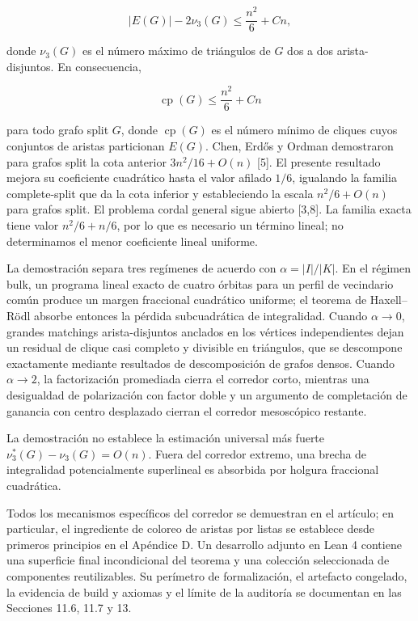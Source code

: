 \documentclass[
  spanish,
  11pt,
  a4paper,
]{article}
\begin{document}
\[
|E(G)|-2\nu_3(G)
\le
\frac{n^2}{6}+Cn,
\]

donde \(\nu_3(G)\) es el número máximo de triángulos de \(G\) dos a dos arista-disjuntos. En consecuencia,

\[
\operatorname{cp}(G)
\le
\frac{n^2}{6}+Cn
\]

para todo grafo split \(G\), donde \(\operatorname{cp}(G)\) es el número mínimo de cliques cuyos conjuntos de aristas particionan \(E(G)\). Chen, Erdős y Ordman demostraron para grafos split la cota anterior \(3n^2/16+O(n)\) {[}5{]}. El presente resultado mejora su coeficiente cuadrático hasta el valor afilado \(1/6\), igualando la familia complete-split que da la cota inferior y estableciendo la escala \(n^2/6+O(n)\) para grafos split. El problema cordal general sigue abierto {[}3,8{]}. La familia exacta tiene valor \(n^2/6+n/6\), por lo que es necesario un término lineal; no determinamos el menor coeficiente lineal uniforme.

La demostración separa tres regímenes de acuerdo con \(\alpha=|I|/|K|\). En el régimen bulk, un programa lineal exacto de cuatro órbitas para un perfil de vecindario común produce un margen fraccional cuadrático uniforme; el teorema de Haxell--Rödl absorbe entonces la pérdida subcuadrática de integralidad. Cuando \(\alpha\to0\), grandes matchings arista-disjuntos anclados en los vértices independientes dejan un residual de clique casi completo y divisible en triángulos, que se descompone exactamente mediante resultados de descomposición de grafos densos. Cuando \(\alpha\to2\), la factorización promediada cierra el corredor corto, mientras una desigualdad de polarización con factor doble y un argumento de completación de ganancia con centro desplazado cierran el corredor mesoscópico restante.

La demostración no establece la estimación universal más fuerte \(\nu_3^*(G)-\nu_3(G)=O(n)\). Fuera del corredor extremo, una brecha de integralidad potencialmente superlineal es absorbida por holgura fraccional cuadrática.

Todos los mecanismos específicos del corredor se demuestran en el artículo; en particular, el ingrediente de coloreo de aristas por listas se establece desde primeros principios en el Apéndice D. Un desarrollo adjunto en Lean 4 contiene una superficie final incondicional del teorema y una colección seleccionada de componentes reutilizables. Su perímetro de formalización, el artefacto congelado, la evidencia de build y axiomas y el límite de la auditoría se documentan en las Secciones 11.6, 11.7 y 13.
\end{document}
